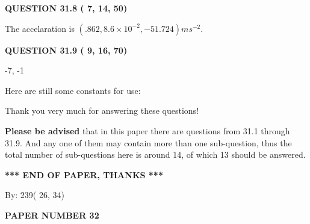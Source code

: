 \documentclass[12pt]{article}
\begin{document}
 
 
  
\vspace{0.2in}
  
{\textbf{\Large{QUESTION
31.8 
 (          7,         14,         50)
}}}
  
  
 
 
\noindent{}
 
 
  The accelaration is $  %
(
.862,
8.6 \times 10^{-2},
-51.724)
ms^{-2} $.
 
 
 
 
  
\vspace{0.2in}
  
{\textbf{\Large{QUESTION
31.9 
 (          9,         16,         70)
}}}
  
  


 
 
\noindent{}

-7,  %
-1
 
 
 
   
   
 \vspace{0.2in}
Here are still some constants for use:
 
 
 
 
Thank you very much for answering these questions!
 
{\textbf{\large{Please be advised}}} that in this paper there are questions from
31.1 through
31.9.
And any one of them may contain more than one sub-question, thus the total number
of sub-questions here is around 14, of which
13 should be answered.
 
   
   
   
   
\vspace{1.0in} 
{\textbf{\large{ *** END OF PAPER, THANKS *** }}} 
   
   
\hspace{1.0in} By: 
         239(         26,          34)
   
   
   
   
\newpage 
\setcounter{page}{ 
    32001 } 
   
   
   
   
 {\textbf{ \Large{ PAPER NUMBER          32 }}}
   
   
\vspace{0.2in}
   
\end{document}
